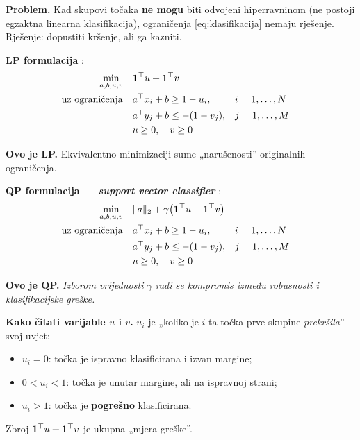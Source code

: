 \textbf{Problem.} Kad skupovi točaka \textbf{ne mogu} biti odvojeni
hiperravninom (ne postoji egzaktna linearna klasifikacija), ograničenja
\eqref{eq:klasifikacija} nemaju rješenje. Rješenje: dopustiti kršenje, ali ga
kazniti.

\textbf{LP formulacija} :
\begin{equation}
\begin{aligned}
\min_{a,b,u,v} \quad & \mathbf{1}\T u + \mathbf{1}\T v \\
\uzogr & a\T x_i + b \ge 1 - u_i, && i = 1,\dots,N \\
       & a\T y_j + b \le -(1 - v_j), && j = 1,\dots,M \\
       & u \ge 0, \quad v \ge 0
\end{aligned}
\end{equation}

\textbf{Ovo je LP.} Ekvivalentno minimizaciji sume „narušenosti” originalnih
ograničenja.

\textbf{QP formulacija --- \emph{support vector classifier}} :
\begin{equation}
\label{eq:svc}
\begin{aligned}
\min_{a,b,u,v} \quad & \|a\|_2 + \gamma\big(\mathbf{1}\T u + \mathbf{1}\T v\big) \\
\uzogr & a\T x_i + b \ge 1 - u_i, && i = 1,\dots,N \\
       & a\T y_j + b \le -(1 - v_j), && j = 1,\dots,M \\
       & u \ge 0, \quad v \ge 0
\end{aligned}
\end{equation}

\textbf{Ovo je QP.} \emph{Izborom vrijednosti $\gamma$ radi se kompromis između
robusnosti i klasifikacijske greške.}

\textbf{Kako čitati varijable $u$ i $v$.} $u_i$ je „koliko je $i$-ta točka
prve skupine \emph{prekršila}” svoj uvjet:
\begin{itemize}
  \item $u_i = 0$: točka je ispravno klasificirana i izvan margine;
  \item $0 < u_i < 1$: točka je unutar margine, ali na ispravnoj strani;
  \item $u_i > 1$: točka je \textbf{pogrešno} klasificirana.
\end{itemize}
Zbroj $\mathbf{1}\T u + \mathbf{1}\T v$ je ukupna „mjera greške”.

